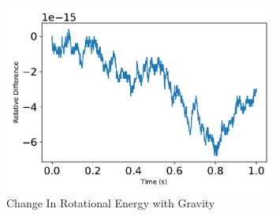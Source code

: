 \begin{figure}[htbp]\centerline{\includegraphics[width=0.8\textwidth]{AutoTeX/ChangeInRotationalEnergy1}}\caption{Change In Rotational Energy with Gravity}\label{fig:ChangeInRotationalEnergy1}\end{figure}